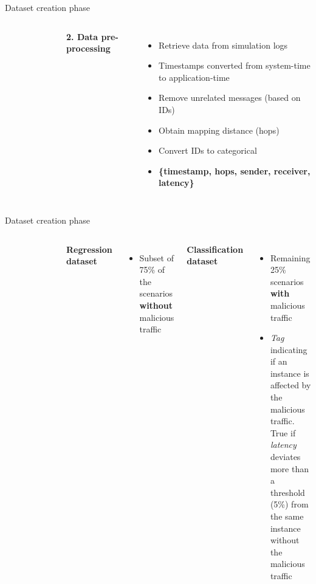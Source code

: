 \begin{frame}{Dataset creation phase}
    \begin{columns}
        \vspace{-1cm}
        \begin{figure}[!ht]
            \centering
            
        \end{figure}

        
        \textbf{\textcolor{omni-spring-pastels-7}{2. Data pre-processing}}
        \begin{itemize}
            \item Retrieve data from simulation logs
            \item Timestamps converted from system-time to application-time
            \item Remove unrelated messages (based on IDs)
            \item Obtain mapping distance (hops)
            \item Convert IDs to categorical
            \item \textbf{\{timestamp, hops, sender, receiver, latency\}}
        \end{itemize}
    \end{columns}
\end{frame}

\begin{frame}{Dataset creation phase}
    \begin{columns}
        \vspace{-1cm}
        \begin{figure}[!ht]
            \centering
            
        \end{figure}

        
        \textbf{\textcolor{omni-spring-pastels-7}{Regression dataset}}
        \begin{itemize}
            \item Subset of 75\% of the scenarios \textbf{without} malicious traffic
        \end{itemize}
        \textbf{\textcolor{omni-spring-pastels-7}{Classification dataset}}
        \begin{itemize}
            \item Remaining 25\% scenarios \textbf{with} malicious traffic
            \item \textit{Tag} indicating if an instance is affected by the malicious traffic. True if \textit{latency}  deviates more than a threshold (5\%) from the same instance without the malicious traffic
        \end{itemize}
    \end{columns}
\end{frame}

